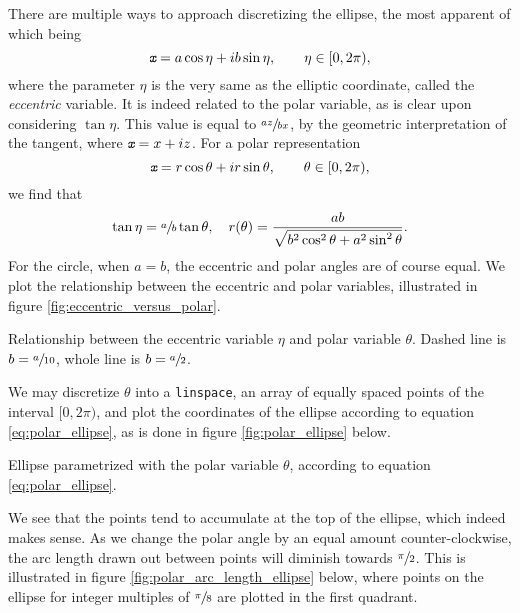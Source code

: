There are multiple ways to approach discretizing the ellipse, the most apparent of which being
\begin{equation}\label{eq:parametric_ellipse}
  {\textit{\texttt{x}}} = a\cos{\eta} + ib\sin{\eta}, \qquad \eta \in [0, 2\pi),
\end{equation}
where the parameter $\eta$ is the very same as the elliptic coordinate, called the \emph{eccentric} variable.
It is indeed related to the polar variable, as is clear upon considering $\tan{\eta}$.
This value is equal to $\sfrac{az}{bx}$, by the geometric interpretation of the tangent, where ${\textit{\texttt{x}}} = x + iz$.
For a polar representation
\begin{equation}\label{eq:polar_ellipse}
{\textit{\texttt{x}}} = r\cos{\theta} + ir\sin{\theta}, \qquad \theta \in [0, 2\pi),
\end{equation}
we find that
\[
\tan{\eta} = \sfrac{a}{b} \tan{\theta}, \quad r(\theta) = \frac{ab}{\sqrt{b^2 \cos^2{\theta} + a^2 \sin^2{\theta}}}.
\]
For the circle, when $a = b$, the eccentric and polar angles are of course equal.
We plot the relationship between the eccentric and polar variables, illustrated in figure \ref{fig:eccentric_versus_polar}.
\begin{Figure}
  \centering
  \scalebox{1}{%
    
  }
  \captionsetup{type = figure}
  \caption{Relationship between the eccentric variable $\eta$ and polar variable $\theta$. Dashed line is $b = \sfrac{a}{10}$, whole line is $b = \sfrac{a}{2}$.}
  \label{fig:eccentric_versus_polar}
\end{Figure}
We may discretize $\theta$ into a \texttt{linspace}, an array of equally spaced points of the interval $[0, 2\pi)$, and plot the coordinates of the ellipse according to equation \eqref{eq:polar_ellipse}, as is done in figure \ref{fig:polar_ellipse} below.
\begin{Figure}
  \centering
  \scalebox{1}{%
    
  }
  \captionsetup{type = figure}
  \caption{Ellipse parametrized with the polar variable $\theta$, according to equation \eqref{eq:polar_ellipse}.}
  \label{fig:polar_ellipse}
\end{Figure}
We see that the points tend to accumulate at the top of the ellipse, which indeed makes sense.
As we change the polar angle by an equal amount counter-clockwise, the arc length drawn out between points will diminish towards $\sfrac{\pi}{2}$.
This is illustrated in figure \ref{fig:polar_arc_length_ellipse} below, where points on the ellipse for integer multiples of $\sfrac{\pi}{8}$ are plotted in the first quadrant.
